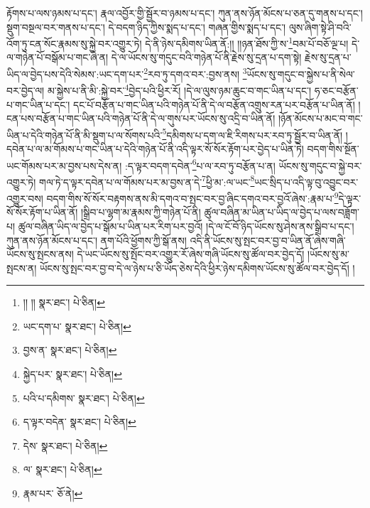 རྟོགས་པ་ལས་ཉམས་པ་དང་། རྣལ་འབྱོར་གྱི་སྦྱོར་བ་ཉམས་པ་དང་། ཀུན་ནས་ཉོན་མོངས་པ་ཅན་དུ་གནས་པ་དང་། སྡུག་བསྔལ་བར་གནས་པ་དང་། དེ་བདག་ཉིད་ཀྱིས་སྨད་པ་དང་། གཞན་གྱིས་སྨད་པ་དང་། ལུས་ཞིག་སྟེ་ཤི་བའི་འོག་ཏུ་ངན་སོང་རྣམས་སུ་སྐྱེ་བར་འགྱུར་ཏེ། དེ་ནི་ཉེས་དམིགས་ཡིན་ནོ:།། །།ཉན་ཐོས་ཀྱི་ས་\footnote{།། །།  སྣར་ཐང་།  པེ་ཅིན། }བམ་པོ་བཅོ་ལྔ་པ། དེ་ལ་གཉེན་པོ་བསྒོམ་པ་གང་ཞེ་ན། དེ་ལ་ཡོངས་སུ་གདུང་བའི་གཉེན་པོ་ནི་རྗེས་སུ་དྲན་པ་དག་སྟེ། རྗེས་སུ་དྲན་པ་ཡིད་ལ་བྱེད་པས་དེའི་སེམས་:ཡང་དག་པར་\footnote{ཡང་དག་པ་  སྣར་ཐང་།  པེ་ཅིན། }རབ་ཏུ་དགའ་བར་:བྱས་ནས། \footnote{བྱས་ན་  སྣར་ཐང་།  པེ་ཅིན། }ཡོངས་སུ་གདུང་བ་སྐྱེས་པ་ནི་སེལ་བར་བྱེད་ལ། མ་སྐྱེས་པ་ནི་མི་:སྐྱེ་བར་\footnote{སྐྱེད་པར་  སྣར་ཐང་།  པེ་ཅིན། }བྱེད་པའི་ཕྱིར་རོ། །དེ་ལ་ལུས་ཉམ་ཆུང་བ་གང་ཡིན་པ་དང་། ཧ་ཅང་བརྩོན་པ་གང་ཡིན་པ་དང་། དང་པོ་བརྩོན་པ་གང་ཡིན་པའི་གཉེན་པོ་ནི་དེ་ལ་བརྩོན་འགྲུས་རན་པར་བརྩོན་པ་ཡིན་ནོ། །ངན་པས་བརྩོན་པ་གང་ཡིན་པའི་གཉེན་པོ་ནི་དེ་ལ་གུས་པར་ཡོངས་སུ་འདྲི་བ་ཡིན་ནོ། །ཉོན་མོངས་པ་མང་བ་གང་ཡིན་པ་དེའི་གཉེན་པོ་ནི་མི་སྡུག་པ་ལ་སོགས་པའི་\footnote{པའི་པ་དམིགས་  སྣར་ཐང་།  པེ་ཅིན། }དམིགས་པ་དག་ལ་ཇི་རིགས་པར་རབ་ཏུ་སྦྱོར་བ་ཡིན་ནོ། །དབེན་པ་ལ་མ་གོམས་པ་གང་ཡིན་པ་དེའི་གཉེན་པོ་ནི་འདི་ལྟར་སོ་སོར་རྟོག་པར་བྱེད་པ་ཡིན་ཏེ། བདག་གིས་སྔོན་ཡང་གོམས་པར་མ་བྱས་པས་དེས་ན། :ད་ལྟར་བདག་དབེན་\footnote{ད་ལྟར་བདེན་  སྣར་ཐང་།  པེ་ཅིན། }པ་ལ་རབ་ཏུ་བརྩོན་པ་ན། ཡོངས་སུ་གདུང་བ་སྐྱེ་བར་འགྱུར་ཏེ། གལ་ཏེ་ད་ལྟར་དབེན་པ་ལ་གོམས་པར་མ་བྱས་ན་དེ་\footnote{དེས་  སྣར་ཐང་།  པེ་ཅིན། }ཕྱི་མ་:ལ་ཡང་\footnote{ལ་  སྣར་ཐང་།  པེ་ཅིན། }ཡང་སྲིད་པ་འདི་ལྟ་བུ་འབྱུང་བར་འགྱུར་བས། བདག་གིས་སོ་སོར་བརྟགས་ནས་མི་དགའ་བ་སྤང་བར་བྱ་ཞིང་དགའ་བར་བྱའོ་ཞེས་:རྣམ་པ་\footnote{རྣམ་པར་  ཅོ་ནེ། }དེ་ལྟར་སོ་སོར་རྟོག་པ་ཡིན་ནོ། །སྒྲིབ་པ་ལྷག་མ་རྣམས་ཀྱི་གཉེན་པོ་ནི། ཚུལ་བཞིན་མ་ཡིན་པ་ཡིད་ལ་བྱེད་པ་ལས་བཟློག་པ། ཚུལ་བཞིན་ཡིད་ལ་བྱེད་པ་སྒོམ་པ་ཡིན་པར་རིག་པར་བྱའོ། །དེ་ལ་ངོ་བོ་ཉིད་ཡོངས་སུ་ཤེས་ནས་སྒྲིབ་པ་དང་། ཀུན་ནས་ཉོན་མོངས་པ་དང་། ནག་པོའི་ཕྱོགས་ཀྱི་སྒོ་ནས། འདི་ནི་ཡོངས་སུ་སྤང་བར་བྱ་བ་ཡིན་ནོ་ཞེས་གཞི་ཡོངས་སུ་སྤངས་ནས། དེ་ཡང་ཡོངས་སུ་སྤོང་བར་འགྱུར་རོ་ཞེས་གཞི་ཡོངས་སུ་ཚོལ་བར་བྱེད་དོ། །ཡོངས་སུ་མ་སྤངས་ན། ཡོངས་སུ་སྤང་བར་བྱ་བ་དེ་ལ་ཉེས་པ་ཅི་ཡོད་ཅེས་དེའི་ཕྱིར་ཉེས་དམིགས་ཡོངས་སུ་ཚོལ་བར་བྱེད་དོ། །
